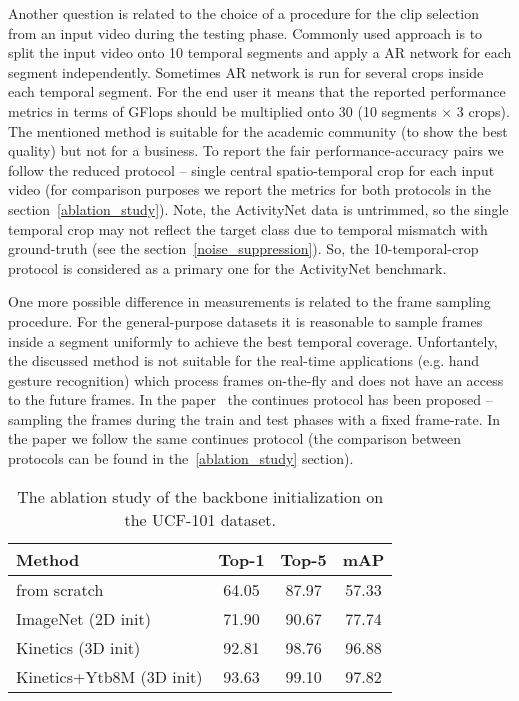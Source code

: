 \documentclass[twoside, twocolumn]{article}
\begin{document}
Another question is related to the choice of a procedure for the clip selection from an input video during the testing
phase. Commonly used approach is to split the input video onto 10 temporal segments and apply a AR network for each
segment independently. Sometimes AR network is run for several crops inside each temporal segment. For the end user it
means that the reported performance metrics in terms of GFlops should be multiplied onto 30 (10 segments $\times$ 3
crops). The mentioned method is suitable for the academic community (to show the best quality) but not for a business.
To report the fair performance-accuracy pairs we follow the reduced protocol -- single central spatio-temporal crop for
each input video (for comparison purposes we report the metrics for both protocols in the section~\ref{ablation_study}).
Note, the ActivityNet data is untrimmed, so the single temporal crop may not reflect the target class due to temporal
mismatch with ground-truth (see the section~\ref{noise_suppression}). So, the 10-temporal-crop protocol is considered as
a primary one for the ActivityNet benchmark.

One more possible difference in measurements is related to the frame sampling procedure. For the general-purpose
datasets it is reasonable to sample frames inside a segment uniformly to achieve the best temporal coverage.
Unfortantely, the discussed method is not suitable for the real-time applications (e.g. hand gesture recognition) which
process frames on-the-fly and does not have an access to the future frames. In the paper~\cite{ASLNet} the continues
protocol has been proposed -- sampling the frames during the train and test phases with a fixed frame-rate. In the paper
we follow the same continues protocol (the comparison between protocols can be found in the~\ref{ablation_study}
section).

\begin{table}[h]
\caption{The ablation study of the backbone initialization on the UCF-101 dataset.}
\label{table:ablation_init}
\centering
\begin{tabular}{l|ccc}
\textbf{Method}           & \textbf{Top-1} & \textbf{Top-5} & \textbf{mAP} \\ \hline
from scratch              & 64.05          & 87.97          & 57.33        \\
ImageNet (2D init)        & 71.90          & 90.67          & 77.74        \\
Kinetics (3D init)        & 92.81          & 98.76          & 96.88        \\
Kinetics+Ytb8M (3D init)  & 93.63          & 99.10          & 97.82   
\end{tabular}
\end{table}
\end{document}

